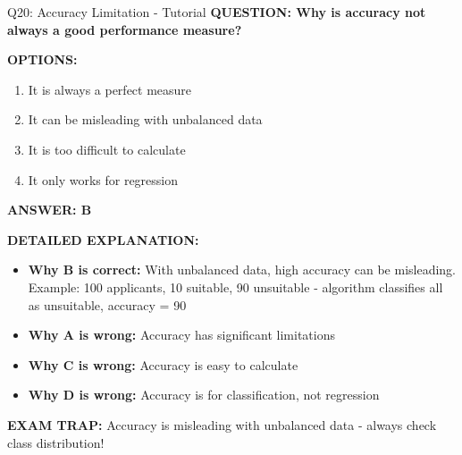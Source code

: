 \documentclass[8pt]{beamer}
\begin{document}
	\begin{frame}{Q20: Accuracy Limitation - Tutorial}
		\fontsize{6.5}{7.5}\selectfont
		\textbf{QUESTION: Why is accuracy not always a good performance measure?}
		
		\vspace{0.1cm}
		\textbf{OPTIONS:}
		\begin{enumerate}
			\item It is always a perfect measure
			\item It can be misleading with unbalanced data
			\item It is too difficult to calculate
			\item It only works for regression
		\end{enumerate}
		
		\vspace{0.1cm}
		\textcolor{myblue}{\textbf{ANSWER: B}}
		
		\vspace{0.1cm}
		\textbf{DETAILED EXPLANATION:}
		\begin{itemize}
			\item \textbf{Why B is correct:} With unbalanced data, high accuracy can be misleading. Example: 100 applicants, 10 suitable, 90 unsuitable - algorithm classifies all as unsuitable, accuracy = 90%
			\item \textbf{Why A is wrong:} Accuracy has significant limitations
			\item \textbf{Why C is wrong:} Accuracy is easy to calculate
			\item \textbf{Why D is wrong:} Accuracy is for classification, not regression
		\end{itemize}
		
		\textcolor{myred}{\textbf{EXAM TRAP:}} Accuracy is \textcolor{myblue}{misleading with unbalanced data} - always check class distribution!
	\end{frame}
	
\end{document}
